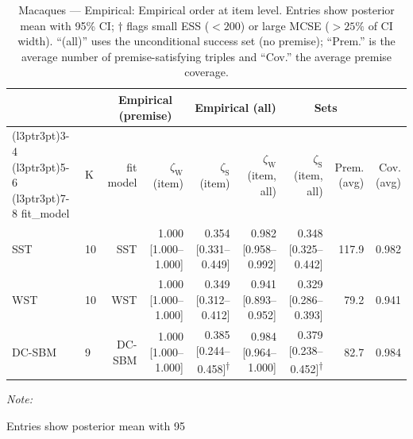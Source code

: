 \begin{table}
\centering
\caption{\label{tab:tab:macaques-empirical-emp-item}Macaques — Empirical: Empirical order at item level. Entries show posterior mean with 95\% CI; $\dagger$ flags small ESS ($<200$) or large MCSE ($>25\%$ of CI width). “(all)” uses the unconditional success set (no premise); “Prem.” is the average number of premise-satisfying triples and “Cov.” the average premise coverage.}
\centering
\begin{threeparttable}
\begin{tabular}[t]{llrrrrrrr}
\toprule
\multicolumn{2}{c}{ } & \multicolumn{2}{c}{Empirical (premise)} & \multicolumn{2}{c}{Empirical (all)} & \multicolumn{2}{c}{Sets} \\
\cmidrule(l{3pt}r{3pt}){3-4} \cmidrule(l{3pt}r{3pt}){5-6} \cmidrule(l{3pt}r{3pt}){7-8}
fit_model & K & fit model & $\zeta_{\mathrm{W}}$ (item) & $\zeta_{\mathrm{S}}$ (item) & $\zeta_{\mathrm{W}}$ (item, all) & $\zeta_{\mathrm{S}}$ (item, all) & Prem. (avg) & Cov. (avg)\\
\midrule
SST & 10 & SST & 1.000 [1.000--1.000] & 0.354 [0.331--0.449] & 0.982 [0.958--0.992] & 0.348 [0.325--0.442] & 117.9 & 0.982\\
WST & 10 & WST & 1.000 [1.000--1.000] & 0.349 [0.312--0.412] & 0.941 [0.893--0.952] & 0.329 [0.286--0.393] & 79.2 & 0.941\\
DC-SBM & 9 & DC-SBM & 1.000 [1.000--1.000] & 0.385 [0.244--0.458]\textsuperscript{$\dagger$} & 0.984 [0.964--1.000] & 0.379 [0.238--0.452]\textsuperscript{$\dagger$} & 82.7 & 0.984\\
\bottomrule
\end{tabular}
\begin{tablenotes}
\item \textit{Note: } 
\item Entries show posterior mean with 95%
\end{tablenotes}
\end{threeparttable}
\end{table}